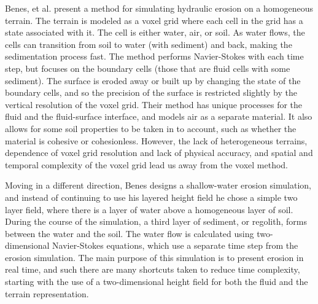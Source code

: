 Benes, et al. \cite{Benes-HydraulicErosion} present a method for simulating hydraulic erosion on a homogeneous terrain. The terrain is modeled as a voxel grid where each cell in the grid has a state associated with it. The cell is either water, air, or soil. As water flows, the cells can transition from soil to water (with sediment) and back, making the sedimentation process fast. The method performs Navier-Stokes with each time step, but focuses on the boundary cells (those that are fluid cells with some sediment). The surface is eroded away or built up by changing the state of the boundary cells, and so the precision of the surface is restricted slightly by the vertical resolution of the voxel grid. Their method has unique processes for the fluid and the fluid-surface interface, and models air as a separate material. It also allows for some soil properties to be taken in to account, such as whether the material is cohesive or cohesionless. However, the lack of heterogeneous terrains, dependence of voxel grid resolution and lack of physical accuracy, and spatial and temporal complexity of the voxel grid lead us away from the voxel method.

Moving in a different direction, Benes \cite{Benes-ShallowWaterSimulation} designs a shallow-water erosion simulation, and instead of continuing to use his layered height field he chose a simple two layer field, where there is a layer of water above a homogeneous layer of soil. During the course of the simulation, a third layer of sediment, or regolith, forms between the water and the soil. The water flow is calculated using two-dimensional Navier-Stokes equations, which use a separate time step from the erosion simulation. The main purpose of this simulation is to present erosion in real time, and such there are many shortcuts taken to reduce time complexity, starting with the use of a two-dimensional height field for both the fluid and the terrain representation. 


